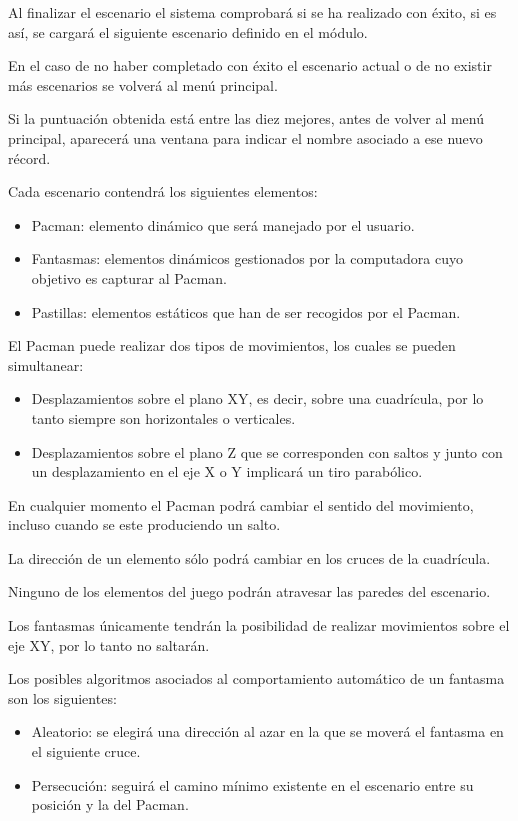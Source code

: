 \begin{description}
 {Al finalizar el escenario el sistema comprobará si se ha realizado con éxito, si es así, se cargará el siguiente escenario definido en el módulo. 

En el caso de no haber completado con éxito el escenario actual o de no existir más escenarios se volverá al menú principal. 

Si la puntuación obtenida está entre las diez mejores, antes de volver al menú principal, aparecerá una ventana para indicar el nombre asociado a ese nuevo récord. 
}

 {Cada escenario contendrá los siguientes elementos: 
	\begin{itemize}
	\item Pacman: elemento dinámico que será manejado por el usuario.
	\item Fantasmas: elementos dinámicos gestionados por la computadora cuyo objetivo es capturar al Pacman.
	\item Pastillas: elementos estáticos que han de ser recogidos por el Pacman.
	\end{itemize}
}

 {El Pacman puede realizar dos tipos de movimientos, los cuales se pueden simultanear:
	\begin{itemize}
	\item Desplazamientos sobre el plano XY, es decir, sobre una cuadrícula, por lo tanto siempre son horizontales o verticales.		
	\item Desplazamientos sobre el plano Z que se corresponden con saltos y junto con un desplazamiento en el eje X o Y implicará un tiro parabólico.
	\end{itemize}
}

 {En cualquier momento el Pacman podrá cambiar el sentido del movimiento, incluso cuando se este produciendo un salto. }

 {La dirección de un elemento sólo podrá cambiar en los cruces de la cuadrícula.}

 {Ninguno de los elementos del juego podrán atravesar las paredes del escenario.}

 {Los fantasmas únicamente tendrán la posibilidad de realizar movimientos sobre el eje XY, por lo tanto no saltarán.}

 {Los posibles algoritmos asociados al comportamiento automático de un fantasma son los siguientes:
	\begin{itemize}
	\item Aleatorio: se elegirá una dirección al azar en la que se moverá el fantasma en el siguiente cruce.
	\item Persecución: seguirá el camino mínimo existente en el escenario entre su posición y la del Pacman.
	\end{itemize}
}


\end{description}
